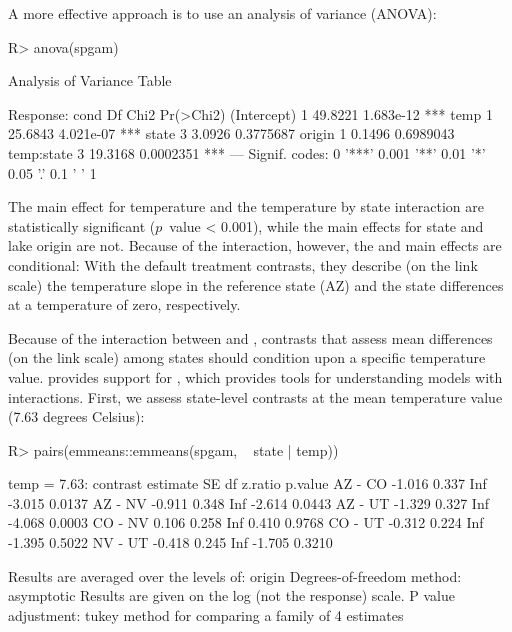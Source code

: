 \documentclass[
]{jss}
\begin{document}
A more effective approach is to use an analysis of variance (ANOVA):

\begin{CodeChunk}
\begin{CodeInput}
R> anova(spgam)
\end{CodeInput}
\begin{CodeOutput}
Analysis of Variance Table

Response: cond
            Df    Chi2 Pr(>Chi2)    
(Intercept)  1 49.8221 1.683e-12 ***
temp         1 25.6843 4.021e-07 ***
state        3  3.0926 0.3775687    
origin       1  0.1496 0.6989043    
temp:state   3 19.3168 0.0002351 ***
---
Signif. codes:  0 '***' 0.001 '**' 0.01 '*' 0.05 '.' 0.1 ' ' 1
\end{CodeOutput}
\end{CodeChunk}

The main effect for temperature and the temperature by state interaction
are statistically significant (\(p\)~value \textless{} 0.001), while the
main effects for state and lake origin are not. Because of the
interaction, however, the  and  main effects are
conditional: With the default treatment contrasts, they describe (on the
link scale) the temperature slope in the reference state (AZ) and the
state differences at a temperature of zero, respectively.

Because of the interaction between  and ,
contrasts that assess mean differences (on the link scale) among states
should condition upon a specific temperature value. 
provides support for , which provides tools for
understanding models with interactions. First, we assess state-level
contrasts at the mean temperature value (7.63 degrees Celsius):

\begin{CodeChunk}
\begin{CodeInput}
R> pairs(emmeans::emmeans(spgam, ~ state | temp))
\end{CodeInput}
\begin{CodeOutput}
temp = 7.63:
 contrast estimate    SE  df z.ratio p.value
 AZ - CO    -1.016 0.337 Inf  -3.015  0.0137
 AZ - NV    -0.911 0.348 Inf  -2.614  0.0443
 AZ - UT    -1.329 0.327 Inf  -4.068  0.0003
 CO - NV     0.106 0.258 Inf   0.410  0.9768
 CO - UT    -0.312 0.224 Inf  -1.395  0.5022
 NV - UT    -0.418 0.245 Inf  -1.705  0.3210

Results are averaged over the levels of: origin 
Degrees-of-freedom method: asymptotic 
Results are given on the log (not the response) scale. 
P value adjustment: tukey method for comparing a family of 4 estimates 
\end{CodeOutput}
\end{CodeChunk}
\end{document}
